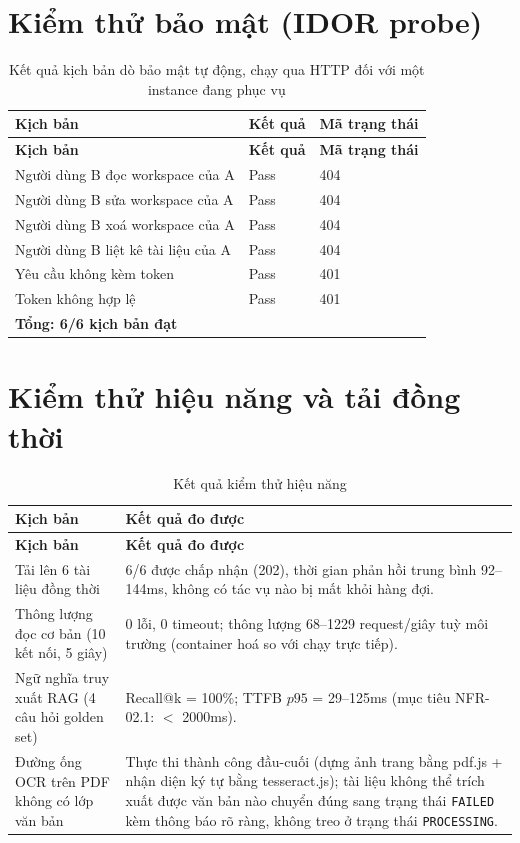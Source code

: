 \section{Kiểm thử bảo mật (IDOR probe)}
\begin{longtable}{|L{0.55\textwidth}|C{0.14\textwidth}|L{0.20\textwidth}|}
\caption{Kết quả kịch bản dò bảo mật tự động, chạy qua HTTP đối với một instance đang phục vụ}\label{tab:appendix-security}\\
\hline
\textbf{Kịch bản} & \textbf{Kết quả} & \textbf{Mã trạng thái} \\\hline
\endfirsthead
\hline
\textbf{Kịch bản} & \textbf{Kết quả} & \textbf{Mã trạng thái} \\\hline
\endhead
Người dùng B đọc workspace của A & Pass & 404 \\\hline
Người dùng B sửa workspace của A & Pass & 404 \\\hline
Người dùng B xoá workspace của A & Pass & 404 \\\hline
Người dùng B liệt kê tài liệu của A & Pass & 404 \\\hline
Yêu cầu không kèm token & Pass & 401 \\\hline
Token không hợp lệ & Pass & 401 \\\hline
\textbf{Tổng: 6/6 kịch bản đạt} & & \\\hline
\end{longtable}

\section{Kiểm thử hiệu năng và tải đồng thời}
\begin{longtable}{|L{0.40\textwidth}|L{0.50\textwidth}|}
\caption{Kết quả kiểm thử hiệu năng}\label{tab:appendix-perf}\\
\hline
\textbf{Kịch bản} & \textbf{Kết quả đo được} \\\hline
\endfirsthead
\hline
\textbf{Kịch bản} & \textbf{Kết quả đo được} \\\hline
\endhead
Tải lên 6 tài liệu đồng thời & 6/6 được chấp nhận (202), thời gian phản hồi trung bình 92--144\;ms, không có tác vụ nào bị mất khỏi hàng đợi. \\\hline
Thông lượng đọc cơ bản (10 kết nối, 5 giây) & 0 lỗi, 0 timeout; thông lượng 68--1229 request/giây tuỳ môi trường (container hoá so với chạy trực tiếp). \\\hline
Ngữ nghĩa truy xuất RAG (4 câu hỏi golden set) & Recall@k = 100\%; TTFB $p95$ = 29--125\;ms (mục tiêu NFR-02.1: $<$ 2000\;ms). \\\hline
Đường ống OCR trên PDF không có lớp văn bản & Thực thi thành công đầu-cuối (dựng ảnh trang bằng pdf.js + nhận diện ký tự bằng tesseract.js); tài liệu không thể trích xuất được văn bản nào chuyển đúng sang trạng thái \texttt{FAILED} kèm thông báo rõ ràng, không treo ở trạng thái \texttt{PROCESSING}. \\\hline
\end{longtable}

